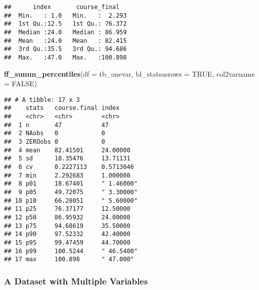 \documentclass[
]{article}
\newenvironment{Shaded}{\begin{snugshade}}{\end{snugshade}}
\newcommand{\DataTypeTok}[1]{\textcolor[rgb]{0.13,0.29,0.53}{#1}}
\newcommand{\KeywordTok}[1]{\textcolor[rgb]{0.13,0.29,0.53}{\textbf{#1}}}
\newcommand{\NormalTok}[1]{#1}
\newcommand{\OtherTok}[1]{\textcolor[rgb]{0.56,0.35,0.01}{#1}}
\begin{document}
\begin{verbatim}
##      index       course_final    
##  Min.   : 1.0   Min.   :  2.293  
##  1st Qu.:12.5   1st Qu.: 76.372  
##  Median :24.0   Median : 86.959  
##  Mean   :24.0   Mean   : 82.415  
##  3rd Qu.:35.5   3rd Qu.: 94.686  
##  Max.   :47.0   Max.   :100.898
\end{verbatim}

\begin{Shaded}
\begin{Highlighting}[]
\KeywordTok{ff_summ_percentiles}\NormalTok{(}\DataTypeTok{df =}\NormalTok{ tb_onevar, }\DataTypeTok{bl_statsasrows =} \OtherTok{TRUE}\NormalTok{, }\DataTypeTok{col2varname =} \OtherTok{FALSE}\NormalTok{)}
\end{Highlighting}
\end{Shaded}

\begin{verbatim}
## # A tibble: 17 x 3
##    stats   course.final index     
##    <chr>   <chr>        <chr>     
##  1 n       47           47        
##  2 NAobs   0            0         
##  3 ZEROobs 0            0         
##  4 mean    82.41501     24.00000  
##  5 sd      18.35476     13.71131  
##  6 cv      0.2227113    0.5713046 
##  7 min     2.292683     1.000000  
##  8 p01     18.67401     " 1.46000"
##  9 p05     49.72075     " 3.30000"
## 10 p10     66.28051     " 5.60000"
## 11 p25     76.37177     12.50000  
## 12 p50     86.95932     24.00000  
## 13 p75     94.68619     35.50000  
## 14 p90     97.52332     42.40000  
## 15 p95     99.47459     44.70000  
## 16 p99     100.5244     " 46.5400"
## 17 max     100.898      " 47.000"
\end{verbatim}

\hypertarget{a-dataset-with-multiple-variables}{%
\subsubsection{A Dataset with Multiple
Variables}\label{a-dataset-with-multiple-variables}}
\end{document}
